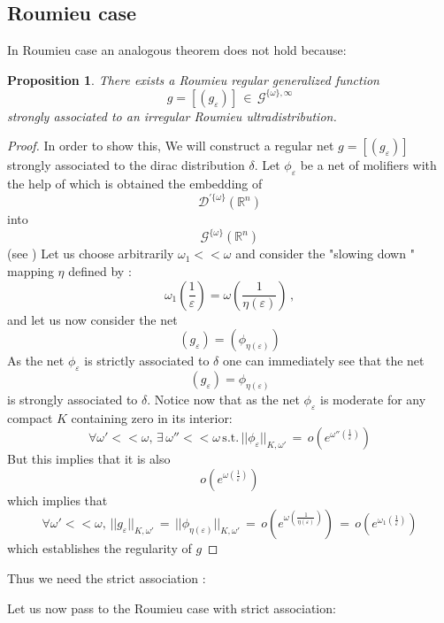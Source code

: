 \documentclass[12pt,a4paper]{amsart}
\newcommand{\RR}{\mathbb R}
\newtheorem{proposition}[theorem]{Proposition}
\begin{document}
     \subsection{Roumieu case}

 In Roumieu case an analogous theorem does not hold because:
 \begin{proposition} 
There exists a Roumieu regular generalized function  
$$g=[(g_\varepsilon)] \,\in\,
\mathcal{G}^{\{\omega\},\infty}$$ strongly associated to an irregular Roumieu ultradistribution. 
 \end{proposition}   
    
 \begin{proof}   
 In order to show this,  We will construct a regular net
    $ g=[(g_\varepsilon)]$ strongly associated to the dirac distribution $\delta$.
    Let $\phi_\varepsilon$ be a net of molifiers with the help of which is obtained the embedding of 
    $$ \mathcal{D}^{' \{\omega\}} (\RR^n)$$ into
    $$ \mathcal{G}^{\{\omega\}} (\RR^n)$$ (see\cite{D.V.V.} )
    Let us choose arbitrarily $\omega_1 <<\omega$
    and consider the "slowing down " mapping $\eta$ defined by :
    $$\omega_1(\frac{1}{\varepsilon}) =
    \omega(\frac{1}{\eta(\varepsilon)}) \,,$$ and let us now consider the net 
    $$ (g_\varepsilon) = (\phi_{\eta(\varepsilon)})$$
    As the net $\phi_\varepsilon$ is strictly associated to $\delta$ one can immediately see that the net 
    $$ (g_\varepsilon) = \phi_{\eta(\varepsilon)}$$
    is strongly associated to $\delta$.
    Notice now that as the net $\phi_\varepsilon$
    is moderate for any compact $K$ containing zero in its interior:
    $$ \forall \omega' <<\omega,\,
    \exists \,\omega''<<\omega \,\mbox{s.t.}\,
    ||\phi_\varepsilon||_{K,\omega'}\,=\,
    o(e^{\omega''(\frac{1}{\varepsilon} )})$$
    But this implies that it is also 
    $$o(e^{\omega(\frac{1}{\varepsilon} )})$$
    which implies that 
    $$\forall \omega' <<\omega,\,
    ||g_\varepsilon||_{K,\omega'}\,=\,
    ||\phi_{\eta(\varepsilon)}||_{K,\omega'}\,=\,
    o(e^{\omega(\frac{1}{\eta(\varepsilon)})}) \,
    =\,o(e^{\omega_1(\frac{1}{\varepsilon})} )$$
    which establishes the regularity of $g$
    \end{proof}
   Thus we need the strict association :
    
    
     
       
     Let us now pass to the Roumieu case with strict association:
  
\end{document}
